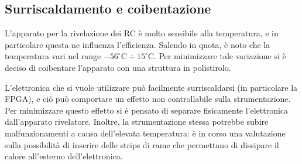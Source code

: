 \subsection{Surriscaldamento e coibentazione}
L'apparato per la rivelazione dei RC è molto sensibile alla temperatura, e in particolare questa ne influenza l'efficienza. Salendo in quota, è noto che la temperatura vari nel range $-56^{\circ}\text{C} \div 15^{\circ}\text{C}$. Per minimizzare tale variazione si è deciso di coibentare l'apparato con una struttura in polistirolo.

L'elettronica che si vuole utilizzare può facilmente surriscaldarsi (in particolare la FPGA), e ciò può comportare un effetto non controllabile sulla strumentazione. Per minimizzare questo effetto si è pensato di separare fisicamente l'elettronica dall'apparato rivelatore. Inoltre, la strumentazione stessa potrebbe subire malfunzionamenti a causa dell'elevata temperatura: è in corso una valutazione sulla possibilità di inserire delle strips di rame che permettano di dissipare il calore all'esterno dell'elettronica.

